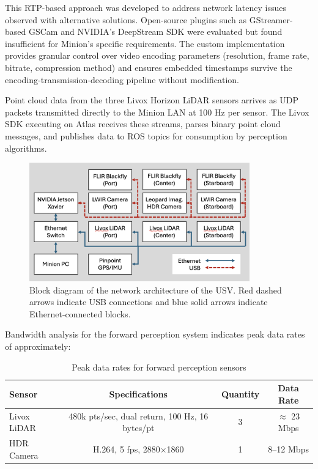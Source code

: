 \documentclass{erauthesis}
\begin{document}
This \ac{RTP}-based approach was developed to address network latency issues observed with alternative solutions. Open-source plugins such as GStreamer-based GSCam and NVIDIA's DeepStream SDK were evaluated but found insufficient for Minion's specific requirements. The custom implementation provides granular control over video encoding parameters (resolution, frame rate, bitrate, compression method) and ensures embedded timestamps survive the encoding-transmission-decoding pipeline without modification.

Point cloud data from the three Livox Horizon \ac{LiDAR} sensors arrives as \ac{UDP} packets transmitted directly to the Minion LAN at 100 Hz per sensor. The Livox SDK executing on Atlas receives these streams, parses binary point cloud messages, and publishes data to \ac{ROS} topics for consumption by perception algorithms. 

\begin{figure}[htbp]
    \centering
    \includegraphics[width=0.85\textwidth]{Images/network_diagram.png}
    \caption{Block diagram of the network architecture of the \ac{USV}. Red dashed arrows indicate USB connections and blue solid arrows indicate Ethernet-connected blocks.}
    \label{fig:network_diag}
\end{figure}

Bandwidth analysis for the forward perception system indicates peak data rates of approximately:

\begin{table}[htbp]
\centering
\caption{Peak data rates for forward perception sensors}
\label{tab:network_bandwidth}
\begin{tabular}{lccc}
\hline
\textbf{Sensor} & \textbf{Specifications} & \textbf{Quantity} & \textbf{Data Rate} \\
\hline
Livox \ac{LiDAR} & 480k pts/sec, dual return, 100 Hz, 16 bytes/pt & 3 & $\approx$ 23 Mbps \\
HDR Camera & H.264, 5 fps, 2880$\times$1860 & 1 & 8--12 Mbps \\
\hline
\end{tabular}
\end{table}
\end{document}
